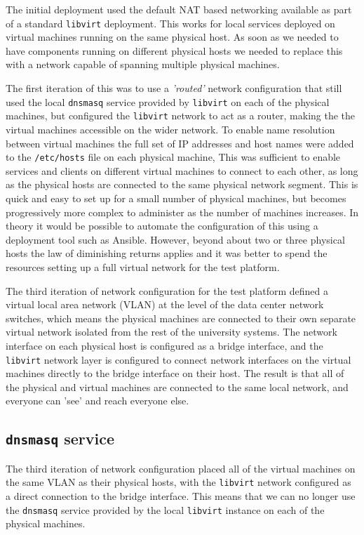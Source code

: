 \documentclass{article}
\newcommand{\ansible} {Ansible\xspace}
\newcommand{\dnsmasq} {\texttt{dnsmasq}\xspace}
\newcommand{\libvirt} {\texttt{libvirt}\xspace}
\newcommand{\testplatform} {test platform\xspace}
\begin{document}
The initial deployment used the default NAT based networking available as part of a standard \libvirt deployment. This works for local services deployed on virtual machines running on the same physical host. As soon as we needed to have components running on different physical hosts we needed to replace this with a network capable of spanning multiple physical machines.

The first iteration of this was to use a \textit{'routed'} network configuration that still used the local \dnsmasq service provided by \libvirt on each of the physical machines, but configured the \libvirt network to act as a router, making the the virtual machines accessible on the wider network.
To enable name resolution between virtual machines the full set of IP addresses and host names were added to the \texttt{/etc/hosts} file on each physical machine, 
This was sufficient to enable services and clients on different virtual machines to connect to each other, as long as the physical hosts are connected to the same physical network segment.
This is quick and easy to set up for a small number of physical machines, but becomes progressively more complex to administer as the number of machines increases.
In theory it would be possible to automate the configuration of this using a deployment tool such as \ansible. However, beyond about two or three physical hosts the law of diminishing returns applies and it was better to spend the resources setting up a full virtual network for the \testplatform.

The third iteration of network configuration for the \testplatform defined a virtual local area network (VLAN) at the level of the data center network switches, which means the physical machines are connected to their own separate virtual network isolated from the rest of the university systems. The network interface on each physical host is configured as a bridge interface, and the \libvirt network layer is configured to connect network interfaces on the virtual machines directly to the bridge interface on their host. The result is that all of the physical and virtual machines are connected to the same local network, and everyone can 'see' and reach everyone else.

\subsection{\texttt{dnsmasq} service}
\label{deployment-testbed.dnsmasq}

The third iteration of network configuration placed all of the virtual machines on the same VLAN as their physical hosts, with the \libvirt network configured as a direct connection to the bridge interface. This means that we can no longer use the \dnsmasq service provided by the local \libvirt instance on each of the physical machines.
\end{document}
